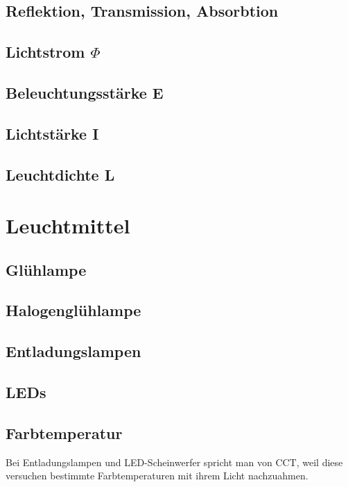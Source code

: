 \section{Reflektion, Transmission, Absorbtion}

\section{Lichtstrom $\Phi$} \label{sec_lumen}

\section{Beleuchtungsstärke E}\label{sec_lux}

\section{Lichtstärke I}\label{sec_candela}

\section{Leuchtdichte L}\label{sec_candelamm}

\chapter{Leuchtmittel}

\section{Glühlampe} \label{sec_glühlampe}

\section{Halogenglühlampe} \label{sec_halogenglühlampe}

\section{Entladungslampen} \label{sec_entladungslampe}

\section{LEDs} \label{sec_led}

\section{Farbtemperatur} \label{sec_farbtemperatur}
Bei Entladungslampen und LED-Scheinwerfer spricht man von CCT, weil diese versuchen bestimmte Farbtemperaturen mit ihrem Licht nachzuahmen.


